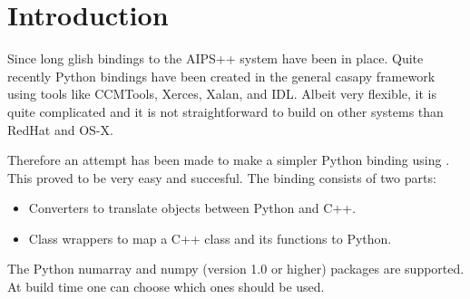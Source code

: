 

\section{Introduction}
Since long glish bindings to the AIPS++ system have been in
place. Quite recently Python bindings have been created in the general
casapy framework using tools like CCMTools, Xerces, Xalan, and
IDL. Albeit very flexible, it is quite complicated and it is not
straightforward to build on other systems than RedHat and OS-X.

Therefore an attempt has been made to make a simpler Python binding
using .
This proved to be very easy and succesful.
The binding consists of two parts:
\begin{itemize}
\item Converters to translate objects between Python and C++.
\item Class wrappers to map a C++ class and its functions to Python.
\end{itemize}
The Python numarray and numpy (version 1.0 or higher) packages are
supported. At build time one can choose which ones should be used.

